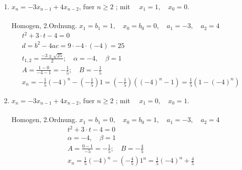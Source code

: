 \begin{enumerate}[label=(\alph*)]
		\item $x_n = -3x_{n-1} +4x_{n-2}$, fuer $n \geq 2 $ ; mit $\quad x_1 = 1, \quad x_0 =0 .$ \\ \\
		Homogen, 2.Ordnung.
	    $x_1 =b_1 = 1, \quad x_0=b_0=0, \quad a_1=-3, \quad a_2=4$\\
	  	\begin{align*}
			   &t^2+3 \cdot t -4 =0 \\
			   &d=b^2-4ac= 9 \cdot -4 \cdot (-4) = 25 \\
			   &t_{1,2}= \frac{-3 \pm \sqrt{25}}{2}; \quad \alpha = -4, \quad \beta =1 \\
			   &A= \frac{1-0}{-4-1} = -\frac{1}{5}; \quad B=-\frac{1}{5}\\
			   &x_n=-\frac{1}{5}(-4)^n - (-\frac{1}{5})1=(- \frac{1}{5})((-4)^n-1)=\frac{1}{5}(1-(-4)^n)
		\end{align*}
 \item $x_n = -3x_{n-1} +4x_{n-2}$, fuer $n \geq 2 $ ; mit $\quad x_1 = 0, \quad x_0 =1 .$ \\ \\
   Homogen, 2.Ordnung.
	    $x_1 =b_1 = 0, \quad x_0=b_0=1, \quad a_1=-3, \quad a_2=4$\\
	    \begin{align*}
	   	   &t^2+3 \cdot t -4 =0 \\
	   	   &\alpha = -4, \quad \beta =1 \\
	   	   &A= \frac{0-1}{-5} = -\frac{1}{5}; \quad B=-\frac{4}{5}\\
	   	   &x_n=\frac{1}{5}(-4)^n - (-\frac{4}{5})1^n=\frac{1}{5}(-4)^n+\frac{4}{5}
	   	   	\end{align*}
    \end{enumerate}







